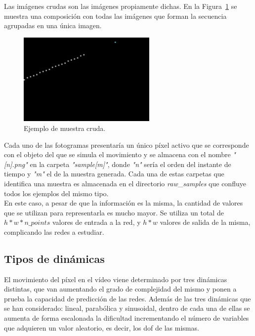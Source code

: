 Las imágenes crudas son las imágenes propiamente dichas. En la Figura~\ref{fig.cruda} se muestra una composición con todas las imágenes que forman la secuencia agrupadas en una única imagen.

\begin{figure}[H]
		\begin{center}
			\includegraphics[width=0.6\textwidth]{Memoria-TFM/figures/samples/linear_sample.png}
			\caption{Ejemplo de muestra cruda.}
			\label{fig.cruda}
		\end{center}
\end{figure}
\vspace{-10pt}
Cada uno de las fotogramas presentaría un único píxel activo que se corresponde con el objeto del que se simula el movimiento y se almacena con el nombre \textit{"[n].png"} en la carpeta \textit{"sample[m]"}, donde \textit{"n"} sería el orden del instante de tiempo y \textit{"m"} el de la muestra generada. Cada una de estas carpetas que identifica una muestra es almacenada en el directorio \textit{raw}\_\textit{samples} que confluye todos los ejemplos del mismo tipo.\\

En este caso, a pesar de que la información es la misma, la cantidad de valores que se utilizan para representarla es mucho mayor. Se utiliza un total de \textit{$h * w * n\_points$}  valores de entrada a la red, y \textit{$h * w$} valores de salida de la misma, complicando las redes a estudiar.

\subsection{Tipos de dinámicas} \label{ap.dinamicas}

El movimiento del píxel en el vídeo viene determinado por tres dinámicas distintas, que van aumentando el grado de complejidad del mismo y ponen a prueba la capacidad de predicción de las redes. Además de las tres dinámicas que se han considerado: lineal, parabólica y  sinusoidal, dentro de cada una de ellas se aumenta de forma escalonada la dificultad incrementando el número de variables que adquieren un valor aleatorio, es decir, los \acrfull{dof} de las mismas.\\

